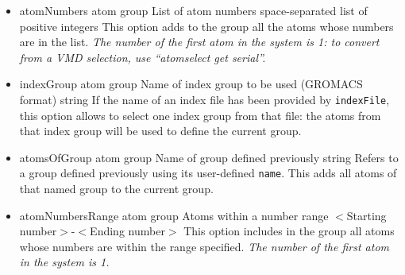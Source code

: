 \begin{itemize}

\item %
  \key
    {atomNumbers}{%
    atom group}{%
    List of atom numbers}{%
    space-separated list of positive integers}{%
    This option adds to the group all the atoms whose numbers are in
    the list.  \emph{The number of the first atom in the system is 1: to convert from a VMD selection, use ``atomselect get serial''.}
  }

\item %
  \key
    {indexGroup}{%
    atom group}{%
    Name of index group to be used (GROMACS format)}{%
    string}{%
    If the name of an index file has been provided by \texttt{indexFile}, this option allows to select one index group from that file: the atoms from that index group will be used to define the current group.}

\item %
  \key
    {atomsOfGroup}{%
    atom group}{%
    Name of group defined previously}{%
    string}{%
    Refers to a group defined previously using its user-defined \texttt{name}.
    This adds all atoms of that named group to the current group.}

\item %
  \key
    {atomNumbersRange}{%
    atom group}{%
    Atoms within a number range}{%
    $<$Starting number$>$-$<$Ending number$>$}{%
    This option includes in the group all atoms whose numbers are within the range specified.  \emph{The number of the first atom in the system is 1.}
  }

\end{itemize}
